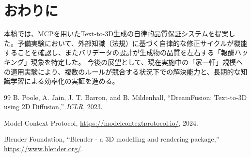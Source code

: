 \documentclass{deimj}
\begin{document}
\section{おわりに}
本稿では、MCPを用いたText-to-3D生成の自律的品質保証システムを提案した。予備実験において、外部知識（法規）に基づく自律的な修正サイクルが機能することを確認し、またバリデータの設計が生成物の品質を左右する「報酬ハッキング」現象を特定した。
今後の展望として、現在実施中の「家一軒」規模への適用実験により、複数のルールが競合する状況下での解決能力と、長期的な知識学習による効率化の実証を進める。

\vspace{2em}

\begin{thebibliography}{99}
  B. Poole, A. Jain, J. T. Barron, and B. Mildenhall,
  ``DreamFusion: Text-to-3D using 2D Diffusion,''
  \textit{ICLR}, 2023.

  Model Context Protocol,
  \url{https://modelcontextprotocol.io/}, 2024.

  Blender Foundation,
  ``Blender - a 3D modelling and rendering package,''
  \url{https://www.blender.org/}.
  
\end{thebibliography}
\end{document}
